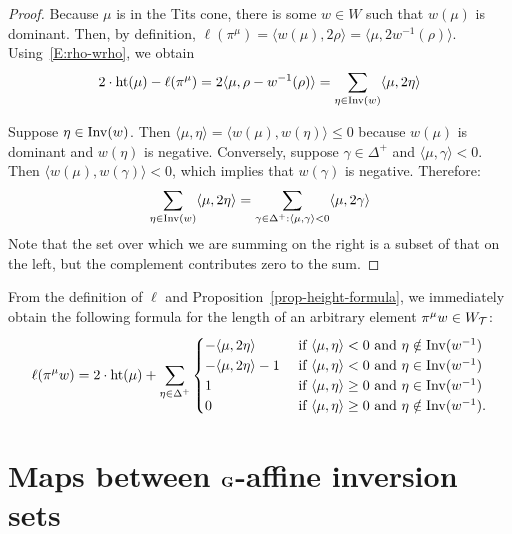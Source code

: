 \documentclass[10pt]{amsart}
\newcommand{\textif}{\text{ if }}\newcommand{\textand}{\text{ and }}\newcommand{\textor}{\text{ or }}\newcommand{\suchthat}{\mid}
\begin{document}
\begin{proof}
Because $\mu$ is in the Tits cone, there is some $w \in W$ such that $w(\mu)$ is dominant. Then, by definition, $\ell(\pi^\mu) = \langle w(\mu), 2\rho \rangle = \langle \mu, 2w^{-1}(\rho) \rangle $. Using~\eqref{E:rho-wrho}, we obtain
\begin{equation}
2\cdot\operatorname{ht}(\mu) - \ell(\pi^\mu) = 2\langle \mu,\rho-w^{-1}(\rho)\rangle = \sum_{\eta\in\operatorname{Inv}(w)} \langle \mu, 2\eta\rangle
\end{equation}

Suppose $\eta \in \operatorname{Inv}(w)$. Then $\langle \mu, \eta \rangle = \langle w(\mu), w(\eta) \rangle \leq 0$ because $w(\mu)$ is dominant and $w(\eta)$ is negative. Conversely, suppose $\gamma\in\Delta^+$ and $\langle \mu, \gamma \rangle < 0$. Then $\langle w(\mu), w(\gamma) \rangle < 0$, which implies that $w(\gamma)$ is negative. Therefore:
\begin{equation}\label{eq:18}
\sum_{\eta \in \Inv(w)} \langle \mu, 2 \eta \rangle = \sum_{\gamma\in\Delta^+ : \langle \mu, \gamma \rangle < 0} \langle \mu, 2\gamma \rangle
\end{equation}
Note that the set over which we are summing on the right is a subset of that on the left, but the complement contributes zero to the sum.
\end{proof}

From the definition of $\ell$ and Proposition~\ref{prop-height-formula}, we immediately obtain the following formula for the length of an arbitrary element $\pi^\mu w\in W_{\mathcal{T}}$:
\begin{equation}\label{eq:19}
\ell(\pi^\mu w) = 2 \cdot \height(\mu) + \sum_{\eta\in\Delta^+}
\begin{cases}
- \langle \mu, 2 \eta \rangle & \textif \langle \mu, \eta \rangle < 0 \textand \eta \notin \Inv(w^{-1}) \\
- \langle \mu, 2 \eta \rangle -1 & \textif \langle \mu, \eta \rangle < 0 \textand \eta \in \Inv(w^{-1}) \\
1 & \textif \langle \mu, \eta \rangle \geq 0 \textand \eta \in \Inv(w^{-1}) \\
0 & \textif \langle \mu, \eta \rangle \geq 0 \textand \eta \notin \Inv(w^{-1}).
\end{cases}
\end{equation}


\section{Maps between \texorpdfstring{$\mathbf{G}$}{G}-affine inversion sets}
\end{document}
